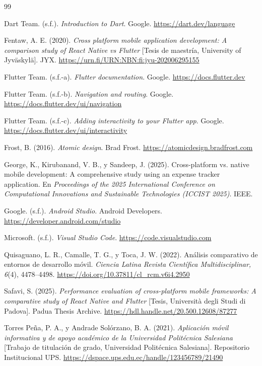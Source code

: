 \documentclass[12pt,a4paper]{article}
\begin{document}
\begin{thebibliography}{99}
\setlength{\itemsep}{0.5em}

Dart Team. (s.f.). \textit{Introduction to Dart}. Google. \url{https://dart.dev/language}

Fentaw, A. E. (2020). \textit{Cross platform mobile application development: A comparison study of React Native vs Flutter} [Tesis de maestría, University of Jyväskylä]. JYX. \url{https://urn.fi/URN:NBN:fi:jyu-202006295155}

Flutter Team. (s.f.-a). \textit{Flutter documentation}. Google. \url{https://docs.flutter.dev}

Flutter Team. (s.f.-b). \textit{Navigation and routing}. Google. \url{https://docs.flutter.dev/ui/navigation}

Flutter Team. (s.f.-c). \textit{Adding interactivity to your Flutter app}. Google. \url{https://docs.flutter.dev/ui/interactivity}

Frost, B. (2016). \textit{Atomic design}. Brad Frost. \url{https://atomicdesign.bradfrost.com}

George, K., Kirubanand, V. B., y Sandeep, J. (2025). Cross-platform vs. native mobile development: A comprehensive study using an expense tracker application. En \textit{Proceedings of the 2025 International Conference on Computational Innovations and Sustainable Technologies (ICCIST 2025)}. IEEE.

Google. (s.f.). \textit{Android Studio}. Android Developers. \url{https://developer.android.com/studio}

Microsoft. (s.f.). \textit{Visual Studio Code}. \url{https://code.visualstudio.com}

Quisaguano, L. R., Camalle, T. G., y Toca, J. W. (2022). Análisis comparativo de entornos de desarrollo móvil. \textit{Ciencia Latina Revista Científica Multidisciplinar, 6}(4), 4478--4498. \url{https://doi.org/10.37811/cl_rcm.v6i4.2950}

Safavi, S. (2025). \textit{Performance evaluation of cross-platform mobile frameworks: A comparative study of React Native and Flutter} [Tesis, Università degli Studi di Padova]. Padua Thesis Archive. \url{https://hdl.handle.net/20.500.12608/87277}

Torres Peña, P. A., y Andrade Solórzano, B. A. (2021). \textit{Aplicación móvil informativa y de apoyo académico de la Universidad Politécnica Salesiana} [Trabajo de titulación de grado, Universidad Politécnica Salesiana]. Repositorio Institucional UPS. \url{https://dspace.ups.edu.ec/handle/123456789/21490}

\end{thebibliography}
\end{document}

